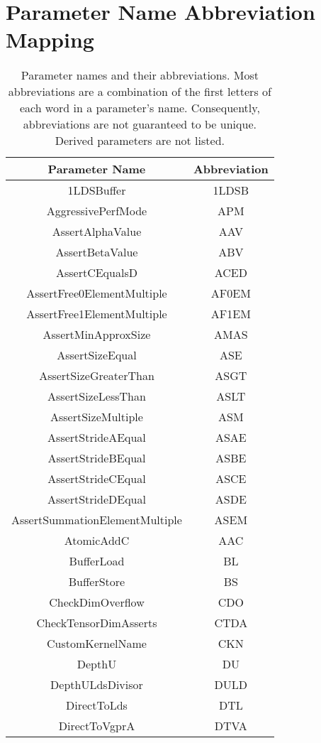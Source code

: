 \documentclass[]{article}
\begin{document}
\section{Parameter Name Abbreviation Mapping}
\begin{center}
\begin{small}
\begin{longtable}{ |c|c| }
\caption{Parameter names and their abbreviations. Most abbreviations are a combination of the first letters of each word in a parameter's name. Consequently, abbreviations are not guaranteed to be unique. Derived parameters are not listed. }
\label{tab:ParameterAbbrMap} \\
 \hline
 \textbf{Parameter Name} & \textbf{Abbreviation} \\
 \hline
 1LDSBuffer & 1LDSB \\
 AggressivePerfMode & APM \\
 AssertAlphaValue & AAV \\
 AssertBetaValue & ABV \\
 AssertCEqualsD & ACED \\
 AssertFree0ElementMultiple & AF0EM \\
 AssertFree1ElementMultiple & AF1EM \\
 AssertMinApproxSize & AMAS \\
 AssertSizeEqual & ASE \\
 AssertSizeGreaterThan & ASGT \\
 AssertSizeLessThan & ASLT \\
 AssertSizeMultiple & ASM \\
 AssertStrideAEqual & ASAE \\
 AssertStrideBEqual & ASBE \\
 AssertStrideCEqual & ASCE \\
 AssertStrideDEqual & ASDE \\
 AssertSummationElementMultiple & ASEM \\
 AtomicAddC & AAC \\
 BufferLoad & BL \\
 BufferStore & BS \\
 CheckDimOverflow & CDO \\
 CheckTensorDimAsserts & CTDA \\
 CustomKernelName & CKN \\
 DepthU & DU \\
 DepthULdsDivisor & DULD \\
 DirectToLds & DTL \\
 DirectToVgprA & DTVA \\

\end{longtable}
\end{small}
\end{center}
\end{document}
